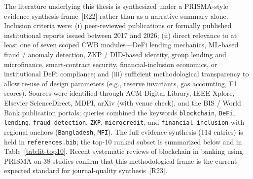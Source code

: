 \documentclass[12pt,a4paper]{report}
\begin{document}
The literature underlying this thesis is synthesized under a PRISMA-style evidence-synthesis frame~[R22] rather than as a narrative summary alone. Inclusion criteria were: (i) peer-reviewed publications or formally published institutional reports issued between 2017 and 2026; (ii) direct relevance to at least one of seven scoped CWB modules---DeFi lending mechanics, ML-based fraud / anomaly detection, ZKP / DID-based identity, group lending and microfinance, smart-contract security, financial-inclusion economics, or institutional DeFi compliance; and (iii) sufficient methodological transparency to allow re-use of design parameters (e.g., reserve invariants, gas accounting, F1 scores). Sources were identified through ACM Digital Library, IEEE Xplore, Elsevier ScienceDirect, MDPI, arXiv (with venue check), and the BIS / World Bank publication portals; queries combined the keywords \texttt{blockchain}, \texttt{DeFi}, \texttt{lending}, \texttt{fraud detection}, \texttt{ZKP}, \texttt{microcredit}, and \texttt{financial inclusion} with regional anchors (\texttt{Bangladesh}, \texttt{MFI}). The full evidence synthesis (114 entries) is held in \texttt{references.bib}; the top-10 ranked subset is summarized below and in Table~\ref{tab:lit-top10}. Recent systematic reviews of blockchain in banking using PRISMA on 38 studies confirm that this methodological frame is the current expected standard for journal-quality synthesis~[R23].
\end{document}
